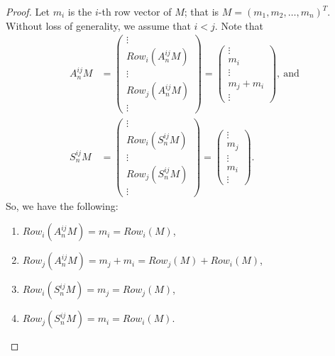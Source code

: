 \begin{proof}
Let $ m_i $ is the $ i $-th row vector of $ M $; that is $ M=(m_1,m_2,…,m_n )^T $. Without loss of generality, we assume that $ i<j $. Note that
\begin{align*}
	A_n^{ij} M &= \left(\begin{matrix}
\vdots \\
Row_i (A_n^{ij}M) \\
\vdots \\
Row_j (A_n^{ij}M) \\
\vdots
\end{matrix}\right)
= \left(\begin{matrix}
\vdots \\
m_i \\
\vdots \\
m_j + m_i \\
\vdots
\end{matrix}\right),\ \text{and} \\
S_n^{ij} M &= \left(\begin{matrix}
\vdots \\
Row_i (S_n^{ij}M) \\
\vdots \\
Row_j (S_n^{ij}M) \\
\vdots
\end{matrix}\right)
= \left(\begin{matrix}
\vdots \\
m_j \\
\vdots \\
m_i \\
\vdots
\end{matrix}\right).
\end{align*}
So, we have the following:
\begin{enumerate}
	\item $ Row_i (A_n^{ij} M)=m_i=Row_i (M) $,
	\item $ Row_j (A_n^{ij} M)=m_j+m_i=Row_j (M)+Row_i (M) $,
	\item $ Row_i (S_n^{ij} M)=m_j=Row_j (M) $,
	\item $ Row_j (S_n^{ij} M)=m_i=Row_i (M) $.
\end{enumerate}
\end{proof}

